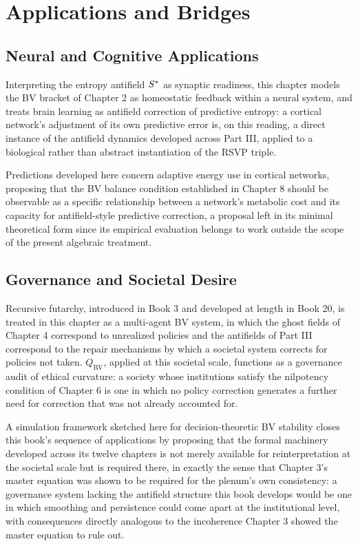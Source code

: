 \part{Applications and Bridges}

\chapter{Neural and Cognitive Applications}

Interpreting the entropy antifield $S^{*}$ as synaptic readiness, this chapter models the BV bracket of Chapter 2 as homeostatic feedback within a neural system, and treats brain learning as antifield correction of predictive entropy: a cortical network's adjustment of its own predictive error is, on this reading, a direct instance of the antifield dynamics developed across Part III, applied to a biological rather than abstract instantiation of the RSVP triple.

Predictions developed here concern adaptive energy use in cortical networks, proposing that the BV balance condition established in Chapter 8 should be observable as a specific relationship between a network's metabolic cost and its capacity for antifield-style predictive correction, a proposal left in its minimal theoretical form since its empirical evaluation belongs to work outside the scope of the present algebraic treatment.

\chapter{Governance and Societal Desire}

Recursive futarchy, introduced in Book 3 and developed at length in Book 20, is treated in this chapter as a multi-agent BV system, in which the ghost fields of Chapter 4 correspond to unrealized policies and the antifields of Part III correspond to the repair mechanisms by which a societal system corrects for policies not taken. $Q_{\text{BV}}$, applied at this societal scale, functions as a governance audit of ethical curvature: a society whose institutions satisfy the nilpotency condition of Chapter 6 is one in which no policy correction generates a further need for correction that was not already accounted for.

A simulation framework sketched here for decision-theoretic BV stability closes this book's sequence of applications by proposing that the formal machinery developed across its twelve chapters is not merely available for reinterpretation at the societal scale but is required there, in exactly the sense that Chapter 3's master equation was shown to be required for the plenum's own consistency: a governance system lacking the antifield structure this book develops would be one in which smoothing and persistence could come apart at the institutional level, with consequences directly analogous to the incoherence Chapter 3 showed the master equation to rule out.

